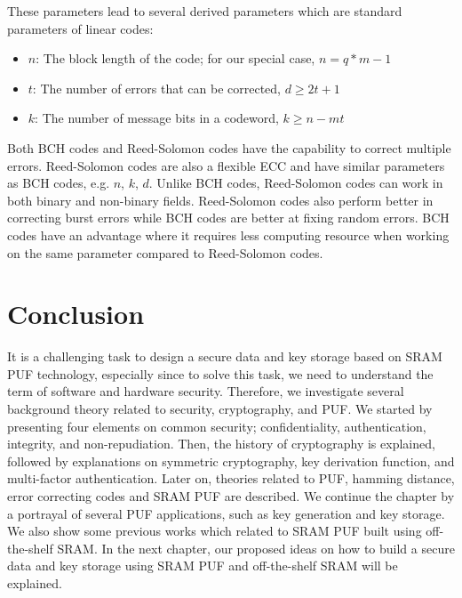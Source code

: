 These parameters lead to several derived parameters which are standard parameters of linear codes:
\begin{itemize}
\item $n$: The block length of the code; for our special case, $n = q*m \minus 1$
\item $t$: The number of errors that can be corrected, $d \geq 2t + 1$
\item $k$: The number of message bits in a codeword, $k \geq n - mt$
\end{itemize}

Both BCH codes and Reed-Solomon codes have the capability to correct multiple errors. Reed-Solomon codes are also a flexible ECC and have similar parameters as BCH codes, e.g. $n$, $k$, $d$.  Unlike BCH codes, Reed-Solomon codes can work in both binary and non-binary fields. Reed-Solomon codes also perform better in correcting burst errors while BCH codes are better at fixing random errors. BCH codes have an advantage where it requires less computing resource when working on the same parameter compared to Reed-Solomon codes.



\section{Conclusion}
It is a challenging task to design a secure data and key storage based on SRAM PUF technology, especially since to solve this task, we need to understand the term of software and hardware security. Therefore, we investigate several background theory related to security, cryptography, and PUF. We started by presenting four elements on common security; confidentiality, authentication, integrity, and non-repudiation. Then, the history of cryptography is explained, followed by explanations on symmetric cryptography, key derivation function, and multi-factor authentication.
Later on, theories related to PUF, hamming distance, error correcting codes and SRAM PUF are described. We continue the chapter by a portrayal of several PUF applications, such as key generation and key storage. We also show some previous works which related to SRAM PUF built using off-the-shelf SRAM. In the next chapter, our proposed ideas on how to build a secure data and key storage using SRAM PUF and off-the-shelf SRAM will be explained.
